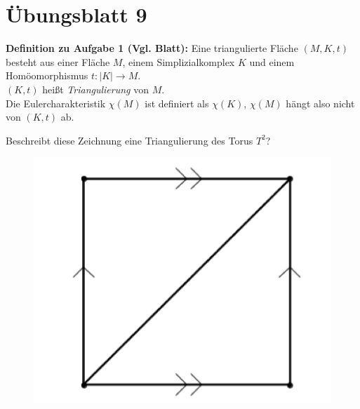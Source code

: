 %
\section{Übungsblatt 9}
\setcounter{problemcounter}{0}

\textbf{Definition zu Aufgabe 1 (Vgl. Blatt):} Eine triangulierte Fläche \( (M, K, t) \) besteht aus einer Fläche \( M \), einem Simplizialkomplex \( K \) und einem Homöomorphismus \( t: \vert K \vert \to M \). \\
\( (K, t) \) heißt \emph{Triangulierung} von \( M \). \\
Die Eulercharakteristik \( \chi(M) \) ist definiert als \( \chi(K) \), \( \chi(M) \) hängt also nicht von \( (K,t) \) ab.

\begin{assignment}
Beschreibt diese Zeichnung eine Triangulierung des Torus $ T^2 $?
    \begin{figure}[H]
        \centering
        \includegraphics[width=\linewidth]{assets/images/triangulation_torus.png}
    \end{figure}
\end{assignment}

